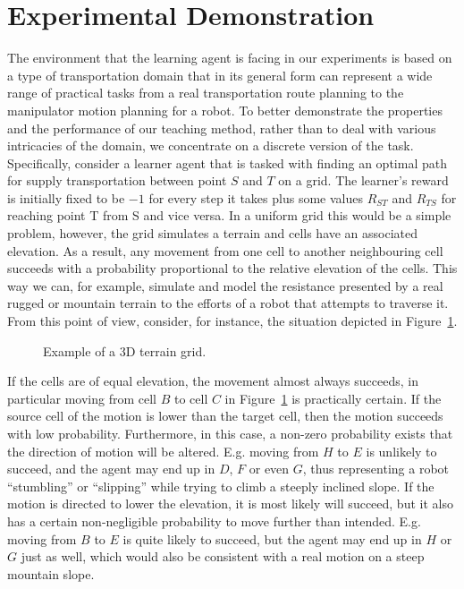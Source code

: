 \section{Experimental Demonstration}\label{sec: experiments}
The environment that the learning agent is facing in our experiments
is based on a type of transportation domain that in its general form
can represent a wide range of practical tasks from a real
transportation route planning to the manipulator motion planning for a
robot. To better demonstrate the properties and the performance of our
teaching method, rather than to deal with various intricacies of the
domain, we concentrate on a discrete version of the
task. Specifically, consider a learner agent that is tasked with
finding an optimal path for supply transportation between point $S$
and $T$ on a grid. The learner's reward is initially fixed to be $-1$
for every step it takes plus some values $R_{ST}$ and $R_{TS}$ for
reaching point T from S and vice versa. In a uniform grid this would
be a simple problem, however, the grid simulates a terrain and cells
have an associated elevation.  As a result, any movement from one cell
to another neighbouring cell succeeds with a probability proportional
to the relative elevation of the cells. This way we can, for example,
simulate and model the resistance presented by a real rugged or
mountain terrain to the efforts of a robot that attempts to traverse
it. From this point of view, consider, for instance, the situation
depicted in Figure~\ref{exp_motion}.

\begin{figure}[ht]
\centerline{}
\caption{\label{exp_motion}Example of a 3D terrain grid.}
\end{figure}

If the cells are of equal elevation, the movement almost always
succeeds, in particular moving from cell $B$ to cell $C$ in
Figure~\ref{exp_motion} is practically certain. If the source cell of
the motion is lower than the target cell, then the motion succeeds
with low probability. Furthermore, in this case, a non-zero
probability exists that the direction of motion will be
altered. E.g. moving from $H$ to $E$ is unlikely to succeed, and the
agent may end up in $D$, $F$ or even $G$, thus representing a robot
``stumbling'' or ``slipping'' while trying to climb a steeply inclined
slope. If the motion is directed to lower the elevation, it is most
likely will succeed, but it also has a certain non-negligible
probability to move further than intended. E.g. moving from $B$ to $E$
is quite likely to succeed, but the agent may end up in $H$ or $G$
just as well, which would also be consistent with a real motion on a
steep mountain slope.


